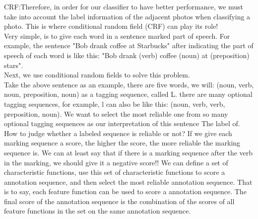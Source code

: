 CRF:Therefore, in order for our classifier to have better performance, we must take into account the label information of the adjacent photos when classifying a photo. This is where conditional random field (CRF) can play its role!\\
Very simple, is to give each word in a sentence marked part of speech. For example, the sentence "Bob drank coffee at Starbucks" after indicating the part of speech of each word is like this: "Bob drank (verb) coffee (noun) at (preposition) stars".\\
Next, we use conditional random fields to solve this problem.\\
Take the above sentence as an example, there are five words, we will: (noun, verb, noun, preposition, noun) as a tagging sequence, called L. there are many optional tagging sequences, for example, l can also be like this: (noun, verb, verb, preposition, noun). We want to select the most reliable one from so many optional tagging sequences as our interpretation of this sentence The label of. How to judge whether a labeled sequence is reliable or not? If we give each marking sequence a score, the higher the score, the more reliable the marking sequence is. We can at least say that if there is a marking sequence after the verb in the marking, we should give it a negative score!! We can define a set of characteristic functions, use this set of characteristic functions to score a annotation sequence, and then select the most reliable annotation sequence. That is to say, each feature function can be used to score a annotation sequence. The final score of the annotation sequence is the combination of the scores of all feature functions in the set on the same annotation sequence.
